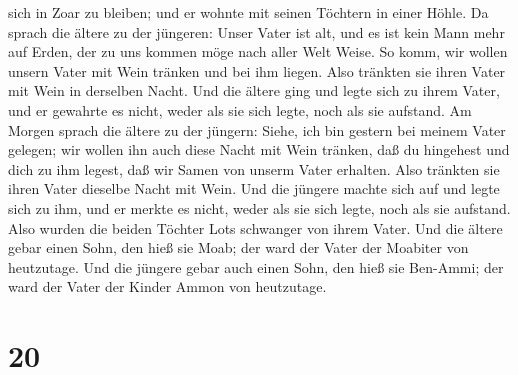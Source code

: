 sich in Zoar zu bleiben; und er wohnte mit seinen Töchtern in einer
Höhle.  Da sprach die ältere zu der jüngeren: Unser Vater
ist alt, und es ist kein Mann mehr auf Erden, der zu uns kommen möge
nach aller Welt Weise.  So komm, wir wollen unsern Vater
mit Wein tränken und bei ihm liegen.  Also tränkten sie
ihren Vater mit Wein in derselben Nacht. Und die ältere ging und legte
sich zu ihrem Vater, und er gewahrte es nicht, weder als sie sich legte,
noch als sie aufstand.  Am Morgen sprach die ältere zu
der jüngern: Siehe, ich bin gestern bei meinem Vater gelegen; wir wollen
ihn auch diese Nacht mit Wein tränken, daß du hingehest und dich zu ihm
legest, daß wir Samen von unserm Vater erhalten.  Also
tränkten sie ihren Vater dieselbe Nacht mit Wein. Und die jüngere machte
sich auf und legte sich zu ihm, und er merkte es nicht, weder als sie
sich legte, noch als sie aufstand.  Also wurden die
beiden Töchter Lots schwanger von ihrem Vater.  Und die
ältere gebar einen Sohn, den hieß sie Moab; der ward der Vater der
Moabiter von heutzutage.  Und die jüngere gebar auch
einen Sohn, den hieß sie Ben-Ammi; der ward der Vater der Kinder Ammon
von heutzutage.

\hypertarget{section-19}{%
\section{20}\label{section-19}}

